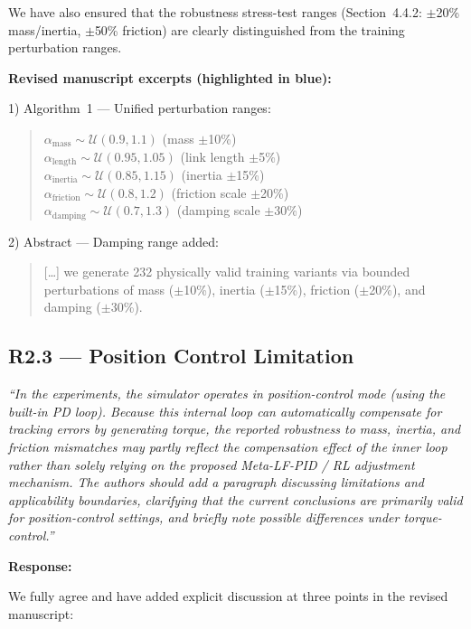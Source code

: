 \documentclass[11pt,a4paper]{article}
\newcommand{\reviewercomment}[1]{\medskip\noindent\textit{``#1''}\medskip}
\newcommand{\response}{\noindent\textbf{Response:}\par\noindent}
\begin{document}
We have also ensured that the robustness stress-test ranges (Section~4.4.2: $\pm$20\% mass/inertia, $\pm$50\% friction) are clearly distinguished from the training perturbation ranges.

\textbf{Revised manuscript excerpts (highlighted in blue):}

1) Algorithm~1 --- Unified perturbation ranges:
\begin{quote}\color{blue}\small
$\alpha_{\mathrm{mass}} \sim \mathcal{U}(0.9, 1.1)$ \hfill (mass $\pm$10\%)\\
$\alpha_{\mathrm{length}} \sim \mathcal{U}(0.95, 1.05)$ \hfill (link length $\pm$5\%)\\
$\alpha_{\mathrm{inertia}} \sim \mathcal{U}(0.85, 1.15)$ \hfill (inertia $\pm$15\%)\\
$\alpha_{\mathrm{friction}} \sim \mathcal{U}(0.8, 1.2)$ \hfill (friction scale $\pm$20\%)\\
$\alpha_{\mathrm{damping}} \sim \mathcal{U}(0.7, 1.3)$ \hfill (damping scale $\pm$30\%)
\end{quote}

2) Abstract --- Damping range added:
\begin{quote}\color{blue}\small
[\ldots] we generate 232 physically valid training variants via bounded perturbations of mass ($\pm$10\%), inertia ($\pm$15\%), friction ($\pm$20\%), and damping ($\pm$30\%).
\end{quote}

\subsection*{R2.3 --- Position Control Limitation}

\reviewercomment{In the experiments, the simulator operates in position-control mode (using the built-in PD loop). Because this internal loop can automatically compensate for tracking errors by generating torque, the reported robustness to mass, inertia, and friction mismatches may partly reflect the compensation effect of the inner loop rather than solely relying on the proposed Meta-LF-PID / RL adjustment mechanism. The authors should add a paragraph discussing limitations and applicability boundaries, clarifying that the current conclusions are primarily valid for position-control settings, and briefly note possible differences under torque-control.}

\response
We fully agree and have added explicit discussion at three points in the revised manuscript:
\end{document}
